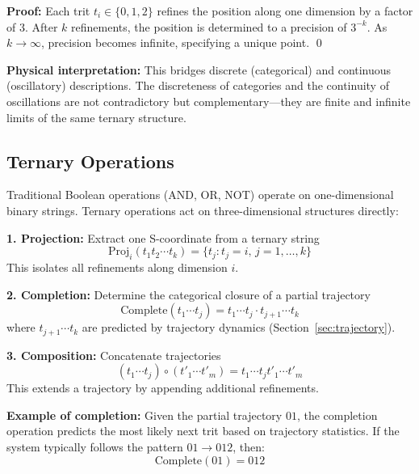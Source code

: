 \textbf{Proof:} Each trit $t_i \in \{0, 1, 2\}$ refines the position along one dimension by a factor of 3. After $k$ refinements, the position is determined to a precision of $3^{-k}$. As $k \to \infty$, precision becomes infinite, specifying a unique point. \qed

\textbf{Physical interpretation:} This bridges discrete (categorical) and continuous (oscillatory) descriptions. The discreteness of categories and the continuity of oscillations are not contradictory but complementary—they are finite and infinite limits of the same ternary structure.

\subsection{Ternary Operations}

Traditional Boolean operations (AND, OR, NOT) operate on one-dimensional binary strings. Ternary operations act on three-dimensional structures directly:

\begin{definition}
\label{def:ternary_operations}

\textbf{1. Projection:} Extract one S-coordinate from a ternary string
\begin{equation}
\text{Proj}_i(t_1 t_2 \cdots t_k) = \{t_j : t_j = i, \, j = 1, \ldots, k\}
\end{equation}
This isolates all refinements along dimension $i$.

\textbf{2. Completion:} Determine the categorical closure of a partial trajectory
\begin{equation}
\text{Complete}(t_1 \cdots t_j) = t_1 \cdots t_j \cdot t_{j+1} \cdots t_k
\end{equation}
where $t_{j+1} \cdots t_k$ are predicted by trajectory dynamics (Section~\ref{sec:trajectory}).

\textbf{3. Composition:} Concatenate trajectories
\begin{equation}
(t_1 \cdots t_j) \circ (t'_1 \cdots t'_m) = t_1 \cdots t_j t'_1 \cdots t'_m
\end{equation}
This extends a trajectory by appending additional refinements.
\end{definition}

\textbf{Example of completion:} Given the partial trajectory $01$, the completion operation predicts the most likely next trit based on trajectory statistics. If the system typically follows the pattern $01 \to 012$, then:
\begin{equation}
\text{Complete}(01) = 012
\end{equation}

